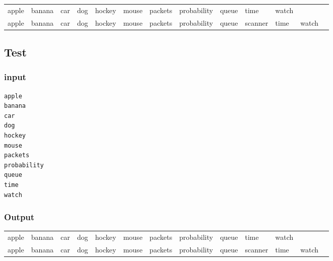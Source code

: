 \documentclass[11pt]{article}
\begin{document}
\begin{center}
\begin{tabular}{lllllllllllll}
apple & banana & car & dog & hockey & mouse & packets & probability & queue & time & watch &  & \\
apple & banana & car & dog & hockey & mouse & packets & probability & queue & scanner & time & watch & \\
\end{tabular}
\end{center}


\subsection*{Test}
\label{sec-8-3}
\subsubsection*{input}
\label{sec-8-3-1}
\begin{verbatim}
apple
banana
car
dog
hockey
mouse
packets
probability
queue
time
watch
\end{verbatim}
\subsubsection*{Output}
\label{sec-8-3-2}
\begin{center}
\begin{tabular}{lllllllllllll}
apple & banana & car & dog & hockey & mouse & packets & probability & queue & time & watch &  & \\
apple & banana & car & dog & hockey & mouse & packets & probability & queue & scanner & time & watch & \\
\end{tabular}
\end{center}
\end{document}
